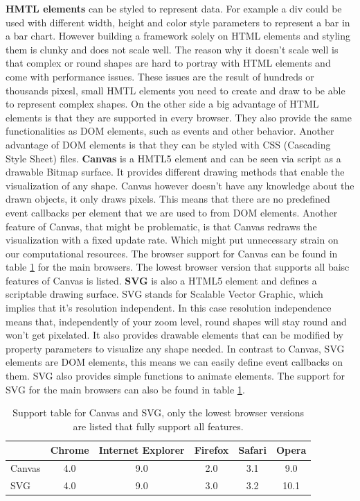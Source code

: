 \documentclass{bioinfo}
\begin{document}
\textbf{HMTL elements} can be styled to represent data. For example a div could be used with different width, height and color style parameters to represent a bar in a bar chart.
However building a framework solely on HTML elements and styling them is clunky and does not scale well.
The reason why it doesn't scale well is that complex or round shapes are hard to portray with HTML elements and come with performance issues. These issues are the result of hundreds or thousands pixesl, small HMTL elements you need to create and draw to be able to represent complex shapes.
On the other side a big advantage of HTML elements is that they are supported in every browser.
They also provide the same functionalities as DOM elements, such as events and other behavior.
Another advantage of DOM elements is that they can be styled with CSS (Cascading Style Sheet) files.
\newline
\textbf{Canvas} is a HMTL5 element and can be seen via script as a drawable Bitmap surface.
It provides different drawing methods that enable the visualization of any shape.
Canvas however doesn't have any knowledge about the drawn objects, it only draws pixels.
This means that there are no predefined event callbacks per element that we are used to from DOM elements.
Another feature of Canvas, that might be problematic, is that Canvas redraws the visualization with a fixed update rate. Which might put unnecessary strain on our computational resources.
The browser support for Canvas can be found in table \ref{t:support} for the main browsers. The lowest browser version that supports all baisc features of Canvas  is listed.
\newline
\textbf{SVG} is also a HTML5 element and defines a scriptable drawing surface. SVG stands for Scalable Vector Graphic, which implies that it's resolution independent. In this case resolution independence means that, independently of your zoom level, round shapes will stay round and won't get pixelated. 
It also provides drawable elements that can be modified by property parameters to visualize any shape needed. In contrast to Canvas, SVG elements are DOM elements, this means we can easily define event callbacks on them. SVG also provides simple functions to animate elements.
The support for SVG for the main browsers can also be found in table \ref{t:support}.

\begin{table}
\begin{tabular}{ l | c | c | c | c | c } 
		& Chrome & Internet Explorer & Firefox & Safari & Opera \\
\hline
Canvas	& 4.0 & 9.0 & 2.0 &	3.1 & 9.0 \\
SVG		& 4.0 & 9.0 & 3.0 &	3.2 & 10.1 \\
\end{tabular}
\caption{Support table for Canvas and SVG, only the lowest browser versions are listed that fully support all features.} \label{t:support}
\end{table}
\end{document}
